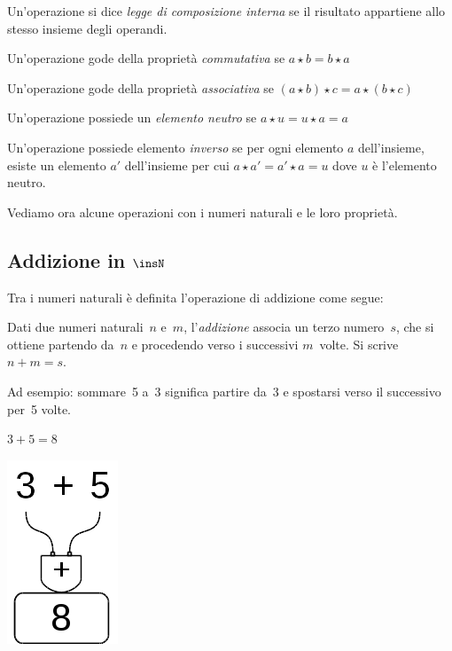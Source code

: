 \begin{itemize*}
 \item Un'operazione si dice \emph{legge di composizione interna} se
  il risultato appartiene allo stesso insieme degli operandi.
 \item Un'operazione gode della proprietà \emph{commutativa} se 
  $a \star b = b \star a$
 \item Un'operazione gode della proprietà \emph{associativa} se 
  $(a \star b) \star c = a \star (b \star c)$
 \item Un'operazione possiede un \emph{elemento neutro} se 
  $a \star u = u \star a = a$
 \item Un'operazione possiede elemento \emph{inverso} se per ogni
  elemento $a$ dell'insieme, esiste un elemento $a'$ 
  dell'insieme per cui $a \star a' = a' \star a = u$ dove $u$ è l'elemento
  neutro.
\end{itemize*}

Vediamo ora alcune operazioni con i numeri naturali e le loro proprietà.

\subsection{Addizione in $\insN$}

Tra i numeri naturali è definita l'operazione di addizione come segue:

\begin{definizione}
  Dati due numeri naturali~$n$ e~$m$, l'\emph{addizione} associa un terzo 
  numero~$s$, che si ottiene partendo da~$n$ e procedendo verso i 
  successivi $m$~volte. Si scrive~$n+m=s$.
\end{definizione}

Ad esempio: sommare~5 a~3 significa partire da~3 e spostarsi verso il 
successivo per~5 volte.

\begin{minipage}{0.80\textwidth}
 \centering
 $3+5=8$

 
\end{minipage}%
\begin{minipage}{0.15\textwidth}
 \centering
\begin{inaccessibleblock}
 \includegraphics[scale=0.35]{img/op_add.png}
\end{inaccessibleblock}
\end{minipage}%

